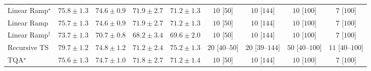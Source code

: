 \begin{tabular}{l|cccc|cccc|}
Linear Ramp$^\star$ & {\cellcolor[HTML]{8C6DB2}} \color[HTML]{F1F1F1} $75.8\pm 1.3$ & {\cellcolor[HTML]{8C86BE}} \color[HTML]{F1F1F1} $74.6\pm 0.9$ & {\cellcolor[HTML]{9EBCDA}} \color[HTML]{000000} $71.9\pm 2.7$ & {\cellcolor[HTML]{A9C4DE}} \color[HTML]{000000} $71.2\pm 1.3$ & {\cellcolor[HTML]{FFF7F3}} \color[HTML]{000000} $10$ [$50$] & {\cellcolor[HTML]{FFF7F3}} \color[HTML]{000000} $10$ [$144$] & {\cellcolor[HTML]{FFF7F3}} \color[HTML]{000000} $10$ [$100$] & {\cellcolor[HTML]{FFF7F3}} \color[HTML]{000000} $7$ [$100$] \\
Linear Ramp & {\cellcolor[HTML]{8C70B3}} \color[HTML]{F1F1F1} $75.7\pm 1.3$ & {\cellcolor[HTML]{8C86BE}} \color[HTML]{F1F1F1} $74.6\pm 0.9$ & {\cellcolor[HTML]{9EBCDA}} \color[HTML]{000000} $71.9\pm 2.7$ & {\cellcolor[HTML]{A9C4DE}} \color[HTML]{000000} $71.2\pm 1.3$ & {\cellcolor[HTML]{FFF7F3}} \color[HTML]{000000} $10$ [$50$] & {\cellcolor[HTML]{FFF7F3}} \color[HTML]{000000} $10$ [$144$] & {\cellcolor[HTML]{FFF7F3}} \color[HTML]{000000} $10$ [$100$] & {\cellcolor[HTML]{FFF7F3}} \color[HTML]{000000} $7$ [$100$] \\
Linear Ramp$^\dagger$ & {\cellcolor[HTML]{8E9AC8}} \color[HTML]{F1F1F1} $73.7\pm 1.3$ & {\cellcolor[HTML]{B1C9E1}} \color[HTML]{000000} $70.7\pm 0.8$ & {\cellcolor[HTML]{DBE8F2}} \color[HTML]{000000} $68.2\pm 3.4$ & {\cellcolor[HTML]{C3D6E8}} \color[HTML]{000000} $69.6\pm 2.0$ & {\cellcolor[HTML]{FFF7F3}} \color[HTML]{000000} $10$ [$50$] & {\cellcolor[HTML]{FFF7F3}} \color[HTML]{000000} $10$ [$144$] & {\cellcolor[HTML]{FFF7F3}} \color[HTML]{000000} $10$ [$100$] & {\cellcolor[HTML]{FFF7F3}} \color[HTML]{000000} $7$ [$100$] \\
Recursive TS & {\cellcolor[HTML]{821580}} \color[HTML]{F1F1F1} $79.7\pm 1.2$ & {\cellcolor[HTML]{8C82BC}} \color[HTML]{F1F1F1} $74.8\pm 1.2$ & {\cellcolor[HTML]{A9C4DE}} \color[HTML]{000000} $71.2\pm 2.4$ & {\cellcolor[HTML]{8C7AB8}} \color[HTML]{F1F1F1} $75.2\pm 1.3$ & {\cellcolor[HTML]{FFF4F0}} \color[HTML]{000000} $20$ [$40$--$50$] & {\cellcolor[HTML]{FFF4F0}} \color[HTML]{000000} $20$ [$39$--$144$] & {\cellcolor[HTML]{FEEEEA}} \color[HTML]{000000} $50$ [$40$--$100$] & {\cellcolor[HTML]{FFF6F2}} \color[HTML]{000000} $11$ [$40$--$100$] \\
TQA$^\star$ & {\cellcolor[HTML]{8C72B5}} \color[HTML]{F1F1F1} $75.6\pm 1.3$ & {\cellcolor[HTML]{8C85BE}} \color[HTML]{F1F1F1} $74.7\pm 1.0$ & {\cellcolor[HTML]{A0BDDB}} \color[HTML]{000000} $71.8\pm 2.7$ & {\cellcolor[HTML]{A9C4DE}} \color[HTML]{000000} $71.2\pm 1.4$ & {\cellcolor[HTML]{FFF7F3}} \color[HTML]{000000} $10$ [$50$] & {\cellcolor[HTML]{FFF7F3}} \color[HTML]{000000} $10$ [$144$] & {\cellcolor[HTML]{FFF7F3}} \color[HTML]{000000} $10$ [$100$] & {\cellcolor[HTML]{FFF7F3}} \color[HTML]{000000} $7$ [$100$] \\

\end{tabular}
